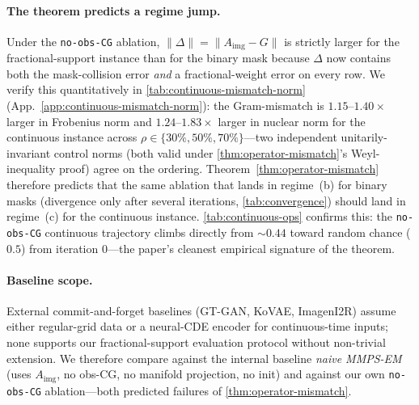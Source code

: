 \documentclass{article}
\theoremstyle{plain}
\theoremstyle{definition}
\theoremstyle{remark}
\newcommand{\Aimg}{A_{\mathrm{img}}}
\begin{document}
\paragraph{The theorem predicts a regime jump.}
Under the \texttt{no-obs-CG} ablation, $\|\Delta\| = \|\Aimg - G\|$ is strictly larger for the fractional-support instance than for the binary mask because $\Delta$ now contains both the mask-collision error \emph{and} a fractional-weight error on every row. We verify this quantitatively in \cref{tab:continuous-mismatch-norm} (App.~\ref{app:continuous-mismatch-norm}): the Gram-mismatch is $1.15$--$1.40\times$ larger in Frobenius norm and $1.24$--$1.83\times$ larger in nuclear norm for the continuous instance across $\rho \in \{30\%, 50\%, 70\%\}$---two independent unitarily-invariant control norms (both valid under \cref{thm:operator-mismatch}'s Weyl-inequality proof) agree on the ordering. Theorem~\ref{thm:operator-mismatch} therefore predicts that the same ablation that lands in regime~(b) for binary masks (divergence only after several iterations, \cref{tab:convergence}) should land in regime~(c) for the continuous instance. \cref{tab:continuous-ops} confirms this: the \texttt{no-obs-CG} continuous trajectory climbs directly from ${\sim}0.44$ toward random chance ($0.5$) from iteration $0$---the paper's cleanest empirical signature of the theorem.

\paragraph{Baseline scope.}
External commit-and-forget baselines (GT-GAN, KoVAE, ImagenI2R) assume either regular-grid data or a neural-CDE encoder for continuous-time inputs; none supports our fractional-support evaluation protocol without non-trivial extension. We therefore compare against the internal baseline \emph{naive MMPS-EM} (uses $\Aimg$, no obs-CG, no manifold projection, no init) and against our own \texttt{no-obs-CG} ablation---both predicted failures of \cref{thm:operator-mismatch}.
\end{document}
